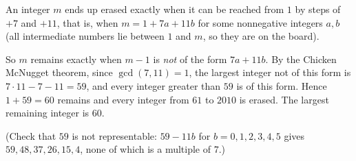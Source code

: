 An integer $m$ ends up erased exactly when it can be reached from $1$ by steps of $+7$ and $+11$, that is, when $m=1+7a+11b$ for some nonnegative integers $a,b$ (all intermediate numbers lie between $1$ and $m$, so they are on the board).

So $m$ remains exactly when $m-1$ is \emph{not} of the form $7a+11b$. By the Chicken McNugget theorem, since $\gcd(7,11)=1$, the largest integer not of this form is $7\cdot11-7-11=59$, and every integer greater than $59$ is of this form. Hence $1+59=60$ remains and every integer from $61$ to $2010$ is erased. The largest remaining integer is $\boxed{60}$.

(Check that $59$ is not representable: $59-11b$ for $b=0,1,2,3,4,5$ gives $59,48,37,26,15,4$, none of which is a multiple of $7$.)
